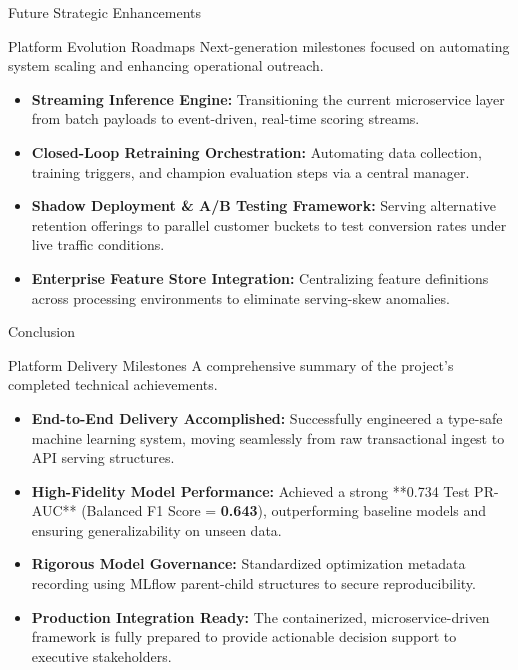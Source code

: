 \begin{frame}{Future Strategic Enhancements}
    \begin{block}{Platform Evolution Roadmaps}
        Next-generation milestones focused on automating system scaling and enhancing operational outreach.
    \end{block}
    \scriptsize
    \begin{itemize}
        \item \textbf{Streaming Inference Engine:} Transitioning the current microservice layer from batch payloads to event-driven, real-time scoring streams.
        \item \textbf{Closed-Loop Retraining Orchestration:} Automating data collection, training triggers, and champion evaluation steps via a central manager.
        \item \textbf{Shadow Deployment \& A/B Testing Framework:} Serving alternative retention offerings to parallel customer buckets to test conversion rates under live traffic conditions.
        \item \textbf{Enterprise Feature Store Integration:} Centralizing feature definitions across processing environments to eliminate serving-skew anomalies.
    \end{itemize}
\end{frame}


\begin{frame}{Conclusion}
    \begin{exampleblock}{Platform Delivery Milestones}
        A comprehensive summary of the project's completed technical achievements.
    \end{exampleblock}
    \scriptsize
    \begin{itemize}
        \item \textbf{End-to-End Delivery Accomplished:} Successfully engineered a type-safe machine learning system, moving seamlessly from raw transactional ingest to API serving structures.
        \item \textbf{High-Fidelity Model Performance:} Achieved a strong **0.734 Test PR-AUC** (Balanced F1 Score = \textbf{0.643}), outperforming baseline models and ensuring generalizability on unseen data.
        \item \textbf{Rigorous Model Governance:} Standardized optimization metadata recording using MLflow parent-child structures to secure reproducibility.
        \item \textbf{Production Integration Ready:} The containerized, microservice-driven framework is fully prepared to provide actionable decision support to executive stakeholders.
    \end{itemize}
\end{frame}


